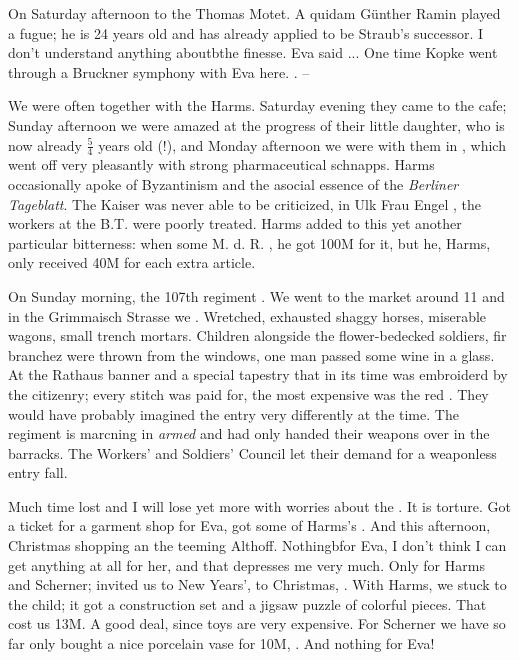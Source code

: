 On Saturday afternoon to the Thomas Motet. A quidam Günther Ramin played a fugue; he is 24 years old and has already applied to be Straub's successor. I don't understand anything aboutbthe finesse. Eva said ... One time Kopke went through a Bruckner symphony with Eva here. . --

We were often together with the Harms. Saturday evening they came to the cafe; Sunday afternoon we were amazed at the progress of their little daughter, who is now already $\frac{5}{4}$ years old (!), and Monday afternoon we were with them in , which went off very pleasantly with strong pharmaceutical schnapps. Harms occasionally apoke of Byzantinism and the asocial essence of the \textit{Berliner Tageblatt}. The Kaiser was never able to be criticized, in Ulk Frau Engel , the workers at the B.T. were poorly treated. Harms added to this yet another particular bitterness: when some M. d. R. , he got 100M for it, but he, Harms, only received 40M for each extra article.

On Sunday morning, the 107th regiment . We went to the market around 11 and in the Grimmaisch Strasse we . Wretched, exhausted shaggy horses, miserable wagons, small trench mortars. Children alongside the flower-bedecked soldiers, fir branchez were thrown from the windows, one man passed  some wine in a glass. At the Rathaus banner and a special tapestry that in its time was embroiderd by the citizenry; every stitch was paid for, the most expensive was the red . They would have probably imagined the entry very differently at the time. The regiment is marcning in \textit{armed} and had only handed their weapons over in the barracks. The Workers' and Soldiers' Council let their demand for a weaponless entry fall.

Much time lost and I will lose yet more with worries about the . It is torture. Got a ticket for a garment shop for Eva, got some of Harms's . And this afternoon, Christmas shopping an the teeming Althoff. Nothingbfor Eva, I don't think I can get anything at all for her, and that depresses me very much. Only for Harms and Scherner;  invited us to New Years',  to Christmas, . With Harms, we stuck to the child; it got a construction set and a jigsaw puzzle of colorful pieces. That cost us 13M. A good deal, since toys are very expensive. For Scherner we have so far only bought a nice porcelain vase for 10M, . And nothing for Eva!

